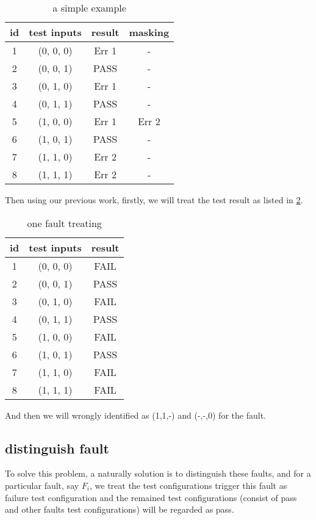 \documentclass{sig-alternate}
\begin{document}
\begin{table}
\centering
\caption{a simple example}
\label{example_first_scenario}
\begin{tabular}{|c|c|c|c|} \hline
id&test inputs & result & masking \\\hline
1&(0, 0, 0) &  Err 1 & -\\ \hline
2&(0, 0, 1) &  PASS & -\\ \hline
3&(0, 1, 0) &  Err 1 & -\\ \hline
4&(0, 1, 1) &  PASS & -\\ \hline
5&(1, 0, 0) &  Err 1 & Err 2\\ \hline
6&(1, 0, 1) &  PASS & -\\ \hline
7&(1, 1, 0) &  Err 2 & -\\ \hline
8&(1, 1, 1) &  Err 2 & -\\ \hline
\hline\end{tabular}
\end{table}

Then using our previous work, firstly, we will treat the test result as listed in \ref{previous_work}.

\begin{table}
\centering
\caption{one fault treating}
\label{previous_work}
\begin{tabular}{|c|c|c|} \hline
id&test inputs & result\\ \hline
1&(0, 0, 0) &  FAIL\\ \hline
2&(0, 0, 1) &  PASS\\ \hline
3&(0, 1, 0) &  FAIL\\ \hline
4&(0, 1, 1) &  PASS\\ \hline
5&(1, 0, 0) &  FAIL\\ \hline
6&(1, 0, 1) &  PASS\\ \hline
7&(1, 1, 0) &  FAIL\\ \hline
8&(1, 1, 1) &  FAIL\\ \hline
\hline\end{tabular}
\end{table}

And then we will wrongly identified as (1,1,-) and (-,-,0) for the fault.

\subsection{distinguish fault}

To solve this problem, a naturally solution is to distinguish these faults, and for a particular fault, say $F_{i}$, we treat the test configurations trigger this fault as failure test configuration and the remained test configurations (consist of pass and other faults test configurations) will be regarded as pass.
\end{document}
